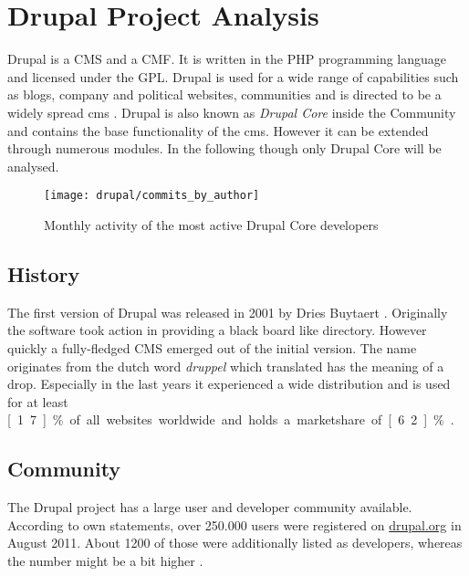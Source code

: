\section{Drupal Project Analysis} %


Drupal is a \ac{CMS} and a \ac{CMF}. It is written in the PHP programming
language and licensed under the \ac{GPL}. Drupal is used for a wide range
of capabilities such as blogs, company and political websites, communities and
is directed to be a widely spread cms \cite{DrupalOverview}. Drupal is also
known as \emph{Drupal Core} inside the Community and contains the base
functionality of the cms. However it can be extended through numerous modules.
In the following though only Drupal Core will be analysed.

\begin{figure}[htbp]
  \centering
  \texttt{[image: drupal/commits\_by\_author]}
  \caption{Monthly activity of the most active Drupal Core developers}
\end{figure}

\subsection{History} %

The first version of Drupal was released in 2001 by Dries Buytaert
\cite{DrupalHistory}. Originally the software took action in providing a black
board like directory. However quickly a fully-fledged \ac{CMS} emerged out of
the initial version. The name originates from the dutch word \emph{druppel}
which translated has the meaning of a drop. Especially in the last years it
experienced a wide distribution and is used for at least \unit[1.7]{\%} of all
websites worldwide and holds a marketshare of \unit[6.2]{\%}
\cite{DrupalBuiltWith,DrupalW3Techs}.


\subsection{Community} %

The Drupal project has a large user and developer community available.
According to own statements, over 250.000 users were registered on
\url{drupal.org} in August 2011. About 1200 of those were additionally listed
as developers, whereas the number might be a bit higher \cite{DrupalBuytaert}.

